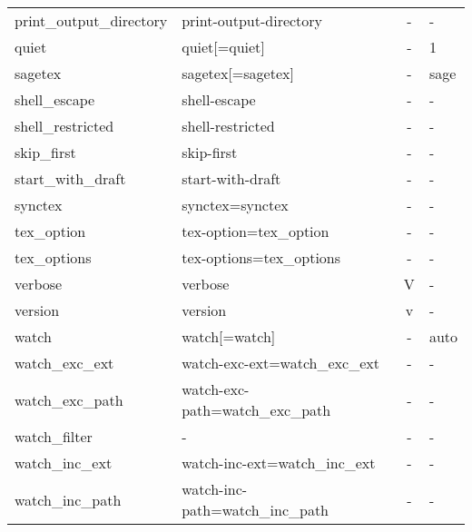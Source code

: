 \begin{longtable}{llcX}
print\_output\_directory & print-output-directory & - & - \\
quiet & quiet[=quiet] & - & 1 \\
sagetex & sagetex[=sagetex] & - & sage \\
shell\_escape & shell-escape & - & - \\
shell\_restricted & shell-restricted & - & - \\
skip\_first & skip-first & - & - \\
start\_with\_draft & start-with-draft & - & - \\
synctex & synctex=synctex & - & - \\
tex\_option & tex-option=tex\_option & - & - \\
tex\_options & tex-options=tex\_options & - & - \\
verbose & verbose & V & - \\
version & version & v & - \\
watch & watch[=watch] & - & auto \\
watch\_exc\_ext & watch-exc-ext=watch\_exc\_ext & - & - \\
watch\_exc\_path & watch-exc-path=watch\_exc\_path & - & - \\
watch\_filter & - & - & - \\
watch\_inc\_ext & watch-inc-ext=watch\_inc\_ext & - & - \\
watch\_inc\_path & watch-inc-path=watch\_inc\_path & - & - \\
\bottomrule
\end{longtable}